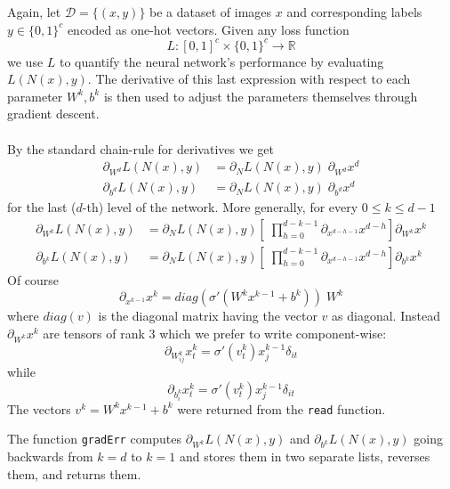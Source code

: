 \documentclass [a4paper,12pt]{article}
\begin{document}
Again, let $\mathcal{D} = \{(x, y)\}$ be a dataset of images $x$ and corresponding labels $y \in \{0,1\}^c$ encoded as one-hot vectors. Given any loss function
$$
L: [0,1]^c \times \{0,1\}^c \longrightarrow \mathbb{R}
$$
we use $L$ to quantify the neural network's performance by evaluating $L(N(x),y)$. The derivative of this last expression with respect to each parameter $W^k, b^k$ is then used to adjust the parameters themselves through gradient descent.
\\\\
By the standard chain-rule for derivatives we get 
\begin{align*}
\partial_{W^d} L(N(x), y) &= \partial_N L(N(x),y) \; \partial_{W^d} x^d \\
\partial_{b^d} L(N(x), y) &= \partial_N L(N(x),y) \; \partial_{b^d} x^d
\end{align*}
for the last ($d$-th) level of the network. More generally, for every $0 \leq k \leq d-1$
\begin{equation} \label{network-derivative}
\begin{aligned}
\partial_{W^{k}} L(N(x), y) &= \partial_N L(N(x),y) \left[ \; \prod_{h=0}^{d-k-1} \partial_{x^{d-h-1}} x^{d-h} \right] \partial_{W^{k}} x^{k}
\\
\partial_{b^{k}} L(N(x), y) &= \partial_N L(N(x),y) \left[ \; \prod_{h=0}^{d-k-1} \partial_{x^{d-h-1}} x^{d-h} \right] \partial_{b^{k}} x^{k}
\end{aligned}
\end{equation}
Of course
$$
\partial_{x^{k-1}} x^k = \textit{diag}( \sigma ' (W^k x^{k-1} + b^k) ) \; W^k
$$
where $\textit{diag}(v)$ is the diagonal matrix having the vector $v$ as diagonal.
Instead $\partial_{W^{k}} x^k$ are tensors of rank 3 which we prefer to write component-wise:
$$
\partial_{W^{k}_{ij}} x^k_t = \sigma ' (v^k_t) x^{k-1}_j \delta_{it}
$$
while
$$
\partial_{b^{k}_{i}} x^k_t = \sigma ' (v^k_t) x^{k-1}_j \delta_{it}
$$
The vectors $v^k = W^k x^{k-1} + b^k$ were returned from the \verb|read| function.

The function \verb|gradErr| computes $\partial_{W^{k}} L(N(x),y)$ and $\partial_{b^{k}} L(N(x),y)$ going backwards from $k = d$ to $k = 1$ and stores them in two separate lists, reverses them, and returns them.
\end{document}
